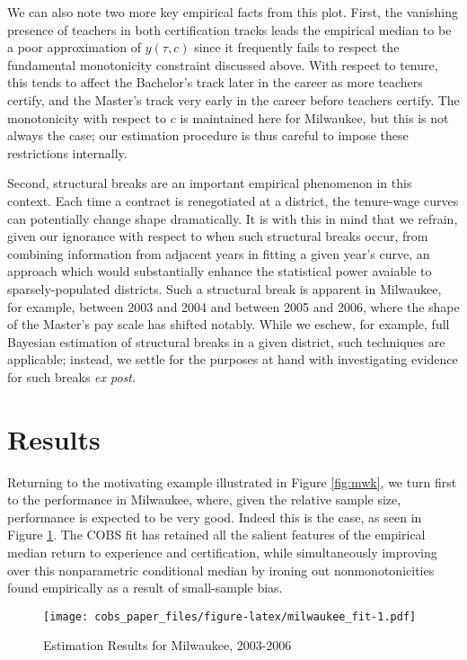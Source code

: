 \documentclass[]{article}
\begin{document}
We can also note two more key empirical facts from this plot. First, the
vanishing presence of teachers in both certification tracks leads the
empirical median to be a poor approximation of \(y(\tau, c)\) since it
frequently fails to respect the fundamental monotonicity constraint
discussed above. With respect to tenure, this tends to affect the
Bachelor's track later in the career as more teachers certify, and the
Master's track very early in the career before teachers certify. The
monotonicity with respect to \(c\) is maintained here for Milwaukee, but
this is not always the case; our estimation procedure is thus careful to
impose these restrictions internally.

Second, structural breaks are an important empirical phenomenon in this
context. Each time a contract is renegotiated at a district, the
tenure-wage curves can potentially change shape dramatically. It is with
this in mind that we refrain, given our ignorance with respect to when
such structural breaks occur, from combining information from adjacent
years in fitting a given year's curve, an approach which would
substantially enhance the statistical power avaiable to
sparsely-populated districts. Such a structural break is apparent in
Milwaukee, for example, between 2003 and 2004 and between 2005 and 2006,
where the shape of the Master's pay scale has shifted notably. While we
eschew, for example, full Bayesian estimation of structural breaks in a
given district, such techniques are applicable; instead, we settle for
the purposes at hand with investigating evidence for such breaks
\emph{ex post}.

\section{Results}\label{results}

Returning to the motivating example illustrated in Figure \ref{fig:mwk},
we turn first to the performance in Milwaukee, where, given the relative
sample size, performance is expected to be very good. Indeed this is the
case, as seen in Figure \ref{fig:mwk_fit}. The COBS fit has retained all
the salient features of the empirical median return to experience and
certification, while simultaneously improving over this nonparametric
conditional median by ironing out nonmonotonicities found empirically as
a result of small-sample bias.

\begin{figure}[htbp]
\centering
\texttt{[image: cobs\_paper\_files/figure-latex/milwaukee\_fit-1.pdf]}
\caption{\label{fig:mwk_fit}Estimation Results for Milwaukee, 2003-2006}
\end{figure}
\end{document}
